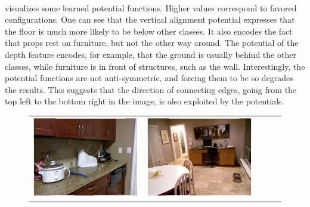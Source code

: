 \pagebreak\\
%
 visualizes some learned potential functions.
Higher values correspond to favored configurations. One can see that the
vertical alignment potential expresses that the floor is much more likely to be below
other classes. It also encodes the fact that props
rest on furniture, but not the other way around.
The potential of the depth feature encodes, for example, that the ground
is usually behind the other classes, while furniture is in front of structures,
such as the wall.
Interestingly, the potential functions are not anti-symmetric, and forcing them to be so
degrades the results. This suggests that the direction of connecting edges, going from
the top left to the bottom right in the image, is also exploited by the potentials.


\begin{figure}
    \begin{tabu} to 
    \includegraphics[width=\linewidth]{nyu/images/00845_image.png}&%
    \includegraphics[width=\linewidth]{nyu/images/00781_image.png}&%

\end{tabu}
\end{figure}
